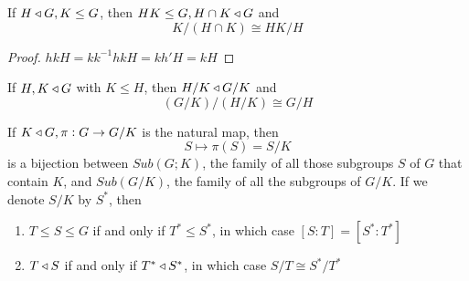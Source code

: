 \documentclass[11pt]{article}
\begin{document}
\begin{theorem}
If \(H\triangleleft G, K\le G\), then \(HK\le G,H\cap K\triangleleft G\) and
\begin{equation*}
K/(H\cap K)\cong HK/H
\end{equation*}
\end{theorem}

\begin{proof}
\(hkH=kk^{-1}hkH=kh'H=kH\)
\end{proof}

\begin{theorem}
If \(H,K\triangleleft G\) with \(K\le H\), then \(H/K\triangleleft G/K\) and
\begin{equation*}
(G/K)/(H/K)\cong G/H
\end{equation*}
\end{theorem}

\begin{theorem}
If \(K\triangleleft G, \pi:G\to G/K\) is the natural map, then
\begin{equation*}
S\mapsto \pi(S)=S/K
\end{equation*}
is a bijection between \(Sub(G;K)\), the family of all those subgroups \(S\) of
\(G\) that contain \(K\), and \(Sub(G/K)\), the family of all the subgroups of
\(G/K\). If we denote \(S/K\) by \(S^*\), then
\begin{enumerate}
\item \(T\le S\le G\) if and only if \(T^*\le S^*\), in which case \([S:T]=[S^*:T^*]\)
\item \(T\triangleleft S\) if and only if \(T^*\triangleleft S^*\), in which case \(S/T\cong S^*/T^*\)
\end{enumerate}
\end{theorem}

\begin{center}
\end{center}
\end{document}
